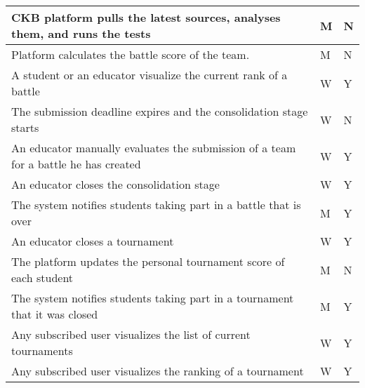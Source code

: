 \begin{center}
\begin{longtable}{|p{8.7cm}|p{3cm}|p{3cm}|}
        CKB platform pulls the latest sources, analyses them, and runs the tests                                                              & M                      & N               \\ \hline
        Platform calculates the battle score of the team.                                                                                     & M                      & N               \\ \hline
        A student or an educator visualize the current rank of a battle                                                                       & W                      & Y               \\ \hline
        The submission deadline expires and the consolidation stage starts                                                                    & W                      & N               \\ \hline
        An educator manually evaluates the submission of a team for a battle he has created                                                   & W                      & Y               \\ \hline
        An educator closes the consolidation stage                                                                                            & W                      & Y               \\ \hline
        The system notifies students taking part in a battle that is over                                                                     & M                      & Y               \\ \hline
        An educator closes a tournament                                                                                                       & W                      & Y               \\ \hline
        The platform updates the personal tournament score of each student                                                                    & M                      & N               \\ \hline
        The system notifies students taking part in a tournament that it was closed                                                           & M                      & Y               \\ \hline
        Any subscribed user visualizes the list of current tournaments                                                                        & W                      & Y               \\ \hline
        Any subscribed user visualizes the ranking of a tournament                                                                            & W                      & Y               \\ \hline

\end{longtable}
\end{center}

